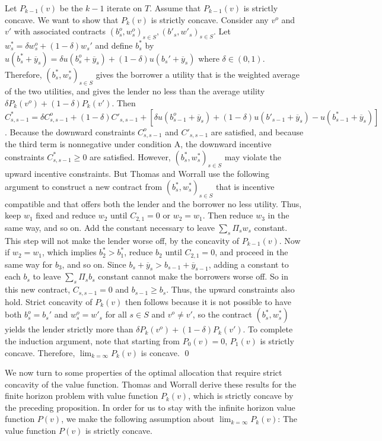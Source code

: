 Let $P_{k-1}(v)$  be the $k-1$ iterate on $T$.
Assume that $P_{k-1}(v)$ is strictly concave. We want
to show that $P_k(v)$ is strictly concave.  Consider any $v^o$ and
$v'$ with associated contracts $(b^o_s,w^o_s)_{s \in S}, (b'_s,w'_s)_{s\in S}$.
Let $w^*_s = \delta w^o_s + (1-\delta) w_s'$ and define $b_s^*$ by
$u(b_s^*+\overline y_s)=\delta u(b^o_s+\overline y_s) + (1-\delta) u(b_s'+
\overline y_s)$ where
$\delta \in (0,1)$.   Therefore,  $(b_s^*,w_s^*)_{s\in S}$ gives the
borrower a utility that is the weighted average of the
two utilities, and gives the lender no less than the average  utility
$\delta P_k(v^o)+(1-\delta)P_k(v')$.  Then $C^*_{s,s-1} = \delta
C^o_{s,s-1} + (1-\delta) C'_{s,s-1} + [\delta u(b^o_{s-1} + \overline y_{s})
+(1-\delta) u(b'_{s-1}+\overline y_s) - u(b^*_{s-1} + \overline y_s) ]$.  Because the downward
constraints $C^o_{s,s-1}$ and $C'_{s,s-1}$ are satisfied,
  and because the third term is nonnegative
under condition A, the downward incentive
constraints $C^*_{s,s-1} \geq 0$ are satisfied.  However,
$(b_s^*,w_s^*)_{s\in S}$ may violate the upward incentive constraints.
But Thomas and Worrall use the following argument to construct a new contract from $(b_s^*,w_s^*)_{s\in S}$
that is incentive compatible and that offers both the lender and
the borrower no less utility.  Thus, keep $w_1$ fixed and reduce
$w_2$ until $C_{2,1} =0$ or $w_2=w_1$.  Then reduce $w_3$ in the
same way, and so on.  Add the constant necessary to
leave $\sum_s \Pi_s w_s$ constant. This step will not make the lender
worse off, by the concavity of $P_{k-1}(v)$.
   Now if $w_2 = w_1$, which implies $b_2^* > b_1^*$,
reduce $b_2$ until $C_{2,1} = 0$, and proceed in the same way
for $b_3$, and so on.  Since $b_s + \overline y_s > b_{s-1} + \overline
y_{s-1}$, adding a
constant
to each $b_s$ to leave $\sum_s \Pi_s b_s$ constant cannot make the
borrowers worse off.  So in this new contract, $C_{s,s-1} =0$
and $b_{s-1} \geq b_s$.  Thus, the upward constraints also hold.
Strict concavity of $P_k(v)$ then follows because it is not
possible to have both $b^o_s = b_s'$ and $w^o_s=w'_s$ for all
$s \in S$ and $v^o\not= v'$,    so the contract $(b_s^*, w_s^*)$ yields the
lender strictly more than $\delta P_{k}(v^o) + (1-\delta) P_{k}(v')$.
To complete the induction argument, note that starting
from $P_0(v) =0$, $P_1(v)$ is strictly concave.  Therefore,
$\lim_{k=\infty}P_k(v)$ is concave.
\qed
\medskip

We  now turn to some properties of the optimal allocation that
require strict concavity of the value function. Thomas and
Worrall derive these results for the finite horizon problem with
value function $P_k(v)$, which is strictly concave by the
preceding proposition. In order for us to stay with the infinite
horizon value function $P(v)$, we make the following assumption
about $\lim_{k=\infty}P_k(v)$:
\medskip
{}  The value function $P(v)$ is strictly concave.
\medskip
\noindent



